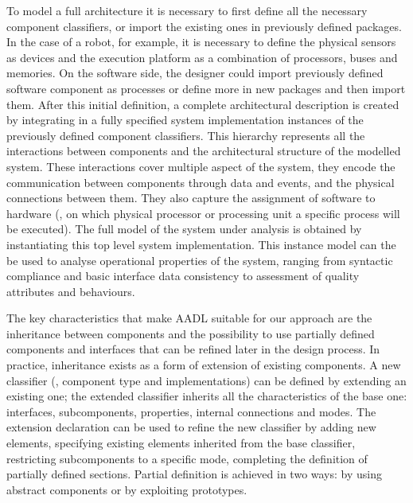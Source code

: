 To model a full architecture it is necessary to first define all the necessary component classifiers, or import the existing ones in previously defined packages. In the case of a robot, for example, it is necessary to define the physical sensors as devices and the execution platform as a combination of processors, buses and memories. On the software side, the designer could import previously defined software component as processes or define more in new packages and then import them. After this initial definition, a complete architectural description is created by integrating in a fully specified system implementation instances of the previously defined component classifiers. This hierarchy represents all the interactions between components and the architectural structure of the modelled system. These interactions cover multiple aspect of the system, they encode the communication between components through data and events, and the physical connections between them. They also capture the assignment of software to hardware (\eg, on which physical processor or processing unit a specific process will be executed). The full model of the system under analysis is obtained by instantiating this top level system implementation. This instance model can the be used to analyse operational properties of the system, ranging from syntactic compliance and basic interface data consistency to assessment of quality attributes and behaviours.

The key characteristics that make AADL suitable for our approach are the inheritance between components and the possibility to use partially defined components and interfaces that can be refined later in the design process. In practice, inheritance exists as a form of extension of existing components. A new classifier (\ie, component type and implementations) can be defined by extending an existing one; the extended classifier inherits all the characteristics of the base one: interfaces, subcomponents, properties, internal connections and modes. The extension declaration can be used to refine the new classifier by adding new elements, specifying existing elements inherited from the base classifier, restricting subcomponents to a specific mode, completing the definition of partially defined sections. Partial definition is achieved in two ways: by using abstract components or by exploiting prototypes.

